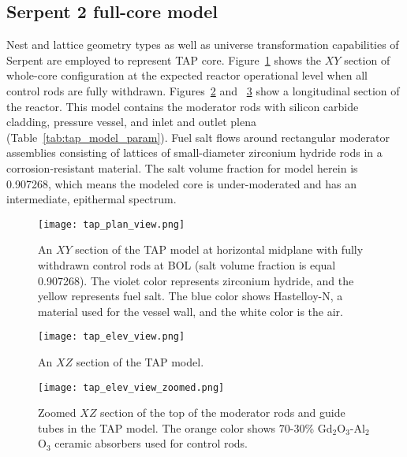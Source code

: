 \subsection{Serpent 2 full-core model} \label{sec:tap_model}
Nest and lattice geometry types as well as universe transformation 
capabilities of Serpent \cite{leppanen_serpent_2013} are employed to represent 
\gls{TAP} core. Figure~\ref{fig:tap-serpent-plan} shows the $XY$ section of 
whole-core
configuration at the expected reactor operational level when all
control rods are fully withdrawn. Figures~\ref{fig:tap-serpent-elev} and 
~\ref{fig:tap-serpent-elev-zoom} show a longitudinal section of the reactor. 
This model contains the moderator rods with silicon carbide cladding, pressure 
vessel, and inlet and outlet plena (Table~\ref{tab:tap_model_param}). Fuel 
salt flows around rectangular moderator assemblies consisting of lattices of 
small-diameter zirconium hydride rods in a corrosion-resistant material. The 
salt volume fraction for model herein is 0.907268, which means the modeled 
core is under-moderated and has an intermediate, epithermal spectrum.
\begin{figure}[htp!] %
	\centering
	\texttt{[image: tap\_plan\_view.png]}
	\caption{An $XY$ section of the \gls{TAP} model at horizontal midplane 
		with fully withdrawn control rods at \gls{BOL} (salt volume fraction 
		is equal 0.907268). 
		The violet color represents zirconium 
		hydride, and the yellow represents fuel salt. The blue color shows 
		Hastelloy-N, a material used for the vessel wall, and the white color 
		is the air.}
	\label{fig:tap-serpent-plan}
\end{figure}
\begin{figure}[htp!] %
	\centering
	\texttt{[image: tap\_elev\_view.png]}
	\caption{An $XZ$ section of the \gls{TAP} model.}
	\label{fig:tap-serpent-elev}
\end{figure}
\begin{figure}[htp!] %
	\centering
	\texttt{[image: tap\_elev\_view\_zoomed.png]}
	\caption{Zoomed $XZ$ section of the top of the moderator rods and guide 
	tubes in the \gls{TAP} model. The orange color shows 70-30\%  
	Gd$_2$O$_3$-Al$_2$O$_3$ ceramic absorbers used for control rods.}
	\label{fig:tap-serpent-elev-zoom}
\end{figure}

